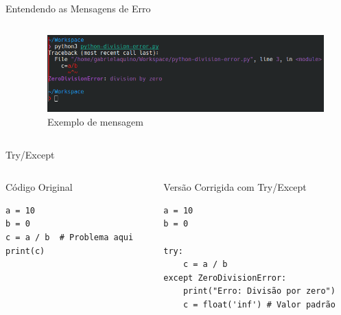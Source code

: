 \begin{frame}{Entendendo as Mensagens de Erro}
\begin{columns}
\begin{column}{0.5\textwidth}
        \end{column}

        \begin{column}{0.5\textwidth}
            \vspace{-0.5cm}
            \begin{figure}
                \includegraphics[width=\textwidth]{Images/python-division-error.png}
                \caption{\footnotesize Exemplo de mensagem}
            \end{figure}


        \end{column}
    \end{columns}
\end{frame}


\begin{frame}[fragile]{Try/Except}
    \vspace{-0.3cm}
    \begin{columns}[T]
        \begin{column}{0.48\textwidth}
            \begin{block}{Código Original}
                \begin{verbatim}
a = 10
b = 0
c = a / b  # Problema aqui
print(c)
            \end{verbatim}


            \end{block}
        \end{column}

        \begin{column}{0.48\textwidth}
            \begin{block}{Versão Corrigida com Try/Except}
                \begin{verbatim}
a = 10
b = 0

try:
    c = a / b
except ZeroDivisionError:
    print("Erro: Divisão por zero")
    c = float('inf') # Valor padrão
            \end{verbatim}


            \end{block}
        \end{column}
    \end{columns}

\end{frame}

